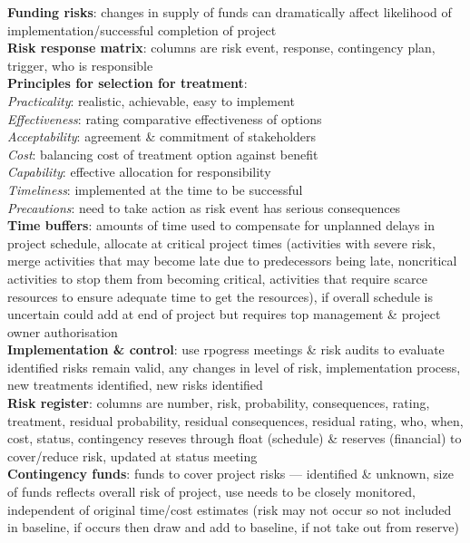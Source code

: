 \documentclass[a4paper]{article}
\begin{document}
\begin{multicols}{2}
        \textbf{Funding risks}: changes in supply of funds can dramatically affect likelihood of implementation/successful completion of project\\
        \textbf{Risk response matrix}: columns are risk event, response, contingency plan, trigger, who is responsible\\
        \textbf{Principles for selection for treatment}:\\
        \textit{Practicality}: realistic, achievable, easy to implement\\
        \textit{Effectiveness}: rating comparative effectiveness of options\\
        \textit{Acceptability}: agreement \& commitment of stakeholders\\
        \textit{Cost}: balancing cost of treatment option against benefit\\
        \textit{Capability}: effective allocation for responsibility\\
        \textit{Timeliness}: implemented at the time to be successful\\
        \textit{Precautions}: need to take action as risk event has serious consequences\\
        \textbf{Time buffers}: amounts of time used to compensate for unplanned delays in project schedule, allocate at critical project times (activities with severe risk, merge activities that may become late due to predecessors being late, noncritical activities to stop them from becoming critical, activities that require scarce resources to ensure adequate time to get the resources), if overall schedule is uncertain could add at end of project but requires top management \& project owner authorisation\\
        \textbf{Implementation \& control}: use rpogress meetings \& risk audits to evaluate identified risks remain valid, any changes in level of risk, implementation process, new treatments identified, new risks identified\\
        \textbf{Risk register}: columns are number, risk, probability, consequences, rating, treatment, residual probability, residual consequences, residual rating, who, when, cost, status, contingency reseves through float (schedule) \& reserves (financial) to cover/reduce risk, updated at status meeting\\
        \textbf{Contingency funds}: funds to cover project risks --- identified \& unknown, size of funds reflects overall risk of project, use needs to be closely monitored, independent of original time/cost estimates (risk may not occur so not included in baseline, if occurs then draw and add to baseline, if not take out from reserve)\\

\end{multicols}
\end{document}
